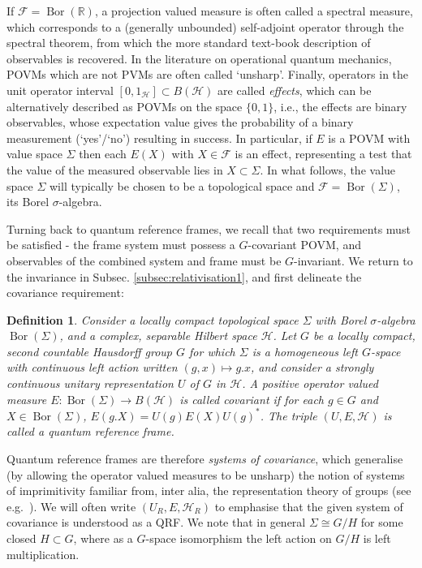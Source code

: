 \documentclass[sn-mathphys-num]{sn-jnl}%
\newcommand{\HH}{\mathcal{H}}
\DeclareMathOperator{\Bor}{Bor}
\numberwithin{equation}{section}
\theoremstyle{thmstyleone}%
\theoremstyle{thmstyletwo}%
\theoremstyle{thmstylethree}%
\newtheorem{definition}[theorem]{Definition}%
\begin{document}
 If $\mathcal{F}=\Bor(\mathbb{R})$, a projection valued measure is often called a spectral measure, which corresponds to a (generally unbounded) self-adjoint operator through the spectral theorem, from which the more standard text-book description of observables is recovered. In the literature on operational quantum mechanics, POVMs which are not PVMs are often called `unsharp'. Finally, operators in the unit operator interval $[0,1_{\HH}]\subset B(\HH)$ are called \emph{effects}, which can be alternatively described as POVMs on the space $\{0,1\}$, i.e., the effects are binary observables, whose expectation value gives the probability of a binary measurement (`yes'/`no') resulting in success. In particular, if $E$ is a POVM with value space $\Sigma$ then each $E(X)$ with $X\in\mathcal{F}$ is an effect, representing a test that the value of the measured observable lies in $X\subset\Sigma$. In what follows, the value space $\Sigma$ will typically be chosen to be a topological space and $\mathcal{F}=\Bor(\Sigma)$, its Borel $\sigma$-algebra.
 
Turning back to quantum reference frames, we recall that two requirements must be satisfied - the frame system must possess a $G$-covariant POVM, and observables of the combined system and frame must be $G$-invariant. We return to the invariance in Subsec. \ref{subsec:relativisation1}, and first delineate the covariance requirement:

\begin{definition} \label{def:qrf1} Consider a locally compact topological space $\Sigma$ with Borel $\sigma$-algebra $\Bor(\Sigma)$, and a complex, separable Hilbert space $\mathcal{H}$. Let $G$ be a locally compact, second countable Hausdorff group $G$ for which $\Sigma$ is a homogeneous left $G$-space with continuous left action written $(g,x) \mapsto g.x$, and consider a strongly continuous unitary representation $U$ of $G$ in $\mathcal{H}$. A positive operator valued measure $E:\Bor(\Sigma)\to B(\mathcal{H})$ is called covariant if for each $g \in G$ and $X \in \Bor(\Sigma)$, $E(g.X) = U(g)E(X)U(g)^*$. The triple $(U,E,\mathcal{H})$ is called a
quantum reference frame.
 \end{definition}

Quantum reference frames are therefore \emph{systems of covariance}, which generalise (by allowing the operator valued measures to be unsharp) the notion of systems of imprimitivity familiar from, inter alia, the representation theory of groups (see e.g.~\cite{mackey1949imprimitivity}). We will often write $(U_R,E,\mathcal{H}_R)$ to emphasise that the given system of covariance is understood as a QRF. We note that in general $\Sigma\cong G/H$ for some closed $H\subset G$, where as a $G$-space isomorphism the left action on $G/H$ is left multiplication.
\end{document}
